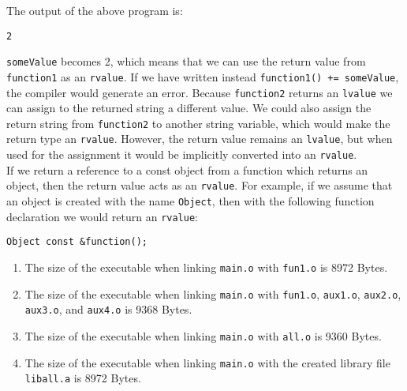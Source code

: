 \documentclass[a4paper]{article}
\newcounter{exerciseCount}
\newcommand{\exercise}[1]{\addtocounter{exerciseCount}{1} \noindent \medskip {\large \textsf{\textbf{Exercise \arabic{exerciseCount} #1}}} \par}
\begin{document}
The output of the above program is:

\begin{verbatim}
2
\end{verbatim}

\verb|someValue| becomes 2, which means that we can use the return value from \verb|function1| as an \verb|rvalue|. If we have written instead \verb|function1() += someValue|, the compiler would generate an error. Because \verb|function2| returns an \verb|lvalue| we can assign to the returned string a different value. We could also assign the return string from \verb|function2| to another string variable, which would make the return type an \verb|rvalue|. However, the return value remains an \verb|lvalue|, but when used for the assignment it would be implicitly converted into an \verb|rvalue|.\\

If we return a reference to a const object from a function which returns an object, then the return value acts as an \verb|rvalue|. For example, if we assume that an object is created with the name \verb|Object|, then with the following function declaration we would return an \verb|rvalue|:

\begin{verbatim}
Object const &function();
\end{verbatim}

\vspace{1em}

\exercise{} %







\begin{enumerate}
	\item The size of the executable when linking \verb|main.o| with \verb|fun1.o| is 8972 Bytes.
	\item The size of the executable when linking \verb|main.o| with \verb|fun1.o|, \verb|aux1.o|, \verb|aux2.o|, \verb|aux3.o|, and \verb|aux4.o| is 9368 Bytes.
	\item The size of the executable when linking \verb|main.o| with \verb|all.o| is 9360 Bytes.
	\item The size of the executable when linking \verb|main.o| with the created library file \verb|liball.a| is 8972 Bytes.
\end{enumerate}
\end{document}
